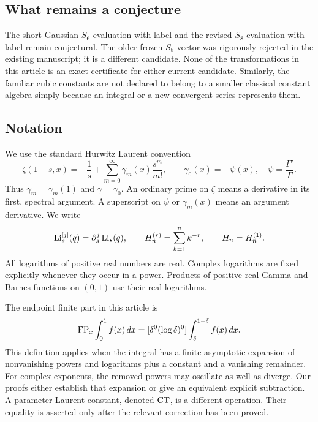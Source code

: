 \subsection{What remains a conjecture}

The short Gaussian $S_6$ evaluation with label
 and the revised $S_8$ evaluation with label
 remain conjectural. The older frozen $S_8$ vector
was rigorously rejected in the existing manuscript; it is a different
candidate. None of the transformations in this article is an exact
certificate for either current candidate. Similarly, the familiar
cubic constants are not declared to belong to a smaller classical
constant algebra simply because an integral or a new convergent
series represents them.

\subsection{Notation}

We use the standard Hurwitz Laurent convention
\begin{equation}\label{bhr:eq:stieltjes-convention}
 \zeta(1-s,x)=-\frac1s+
    \sum_{m=0}^{\infty}\gamma_m(x)\frac{s^m}{m!},
 \qquad \gamma_0(x)=-\psi(x),\quad \psi=\frac{\Gamma'}\Gamma.
\end{equation}
Thus $\gamma_m=\gamma_m(1)$ and $\gamma=\gamma_0$.
An ordinary prime on $\zeta$ means a derivative in its first,
spectral argument. A superscript on $\psi$ or $\gamma_m(x)$ means
an argument derivative. We write
\[
 \operatorname{Li}_s^{[j]}(q)=\partial_s^j\operatorname{Li}_s(q),\qquad
 H_n^{(r)}=\sum_{k=1}^n k^{-r},\qquad H_n=H_n^{(1)}.
\]
All logarithms of positive real numbers are real. Complex logarithms
are fixed explicitly whenever they occur in a power. Products of
positive real Gamma and Barnes functions on $(0,1)$ use their real
logarithms.

The endpoint finite part in this article is
\begin{equation}\label{bhr:eq:fp-definition}
 \operatorname{FP}_x\int_0^1 f(x)\,dx
   = [\delta^0(\log\delta)^0]
       \int_{\delta}^{1-\delta}f(x)\,dx.
\end{equation}
This definition applies when the integral has a finite asymptotic
expansion of nonvanishing powers and logarithms plus a constant and a
vanishing remainder. For complex exponents, the removed powers may
oscillate as well as diverge. Our proofs either establish that expansion or
give an equivalent explicit subtraction. A parameter Laurent
constant, denoted $\operatorname{CT}$, is a different operation. Their equality
is asserted only after the relevant correction has been proved.

